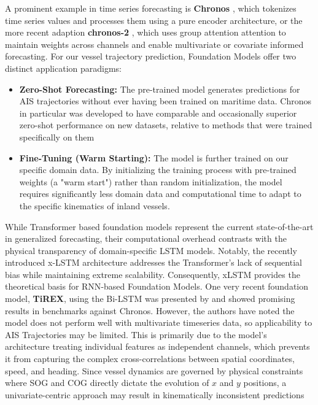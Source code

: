     A prominent example in time series forecasting is \textbf{Chronos} \cite{ansari2024chronoslearninglanguagetime}, which tokenizes time series values and processes them using a pure encoder architecture, or the more recent adaption \textbf{chronos-2} \parencite{ansari2025chronos2}, which uses group attention attention to maintain weights across channels and enable multivariate or covariate informed forecasting. For our vessel trajectory prediction, Foundation Models offer two distinct application paradigms:
    \begin{itemize}
        \item \textbf{Zero-Shot Forecasting:} The pre-trained model generates predictions for \ac{AIS} trajectories without ever having been trained on maritime data. Chronos in particular was developed to  have comparable and occasionally superior zero-shot performance on new datasets, relative to methods that were trained specifically on them \cite{ansari2024chronoslearninglanguagetime}
        \item \textbf{Fine-Tuning (Warm Starting):} The model is further trained on our specific domain data. By initializing the training process with pre-trained weights (a "warm start") rather than random initialization, the model requires significantly less domain data and computational time to adapt to the specific kinematics of inland vessels.
    \end{itemize} 

    While Transformer based foundation models represent the current state-of-the-art in generalized forecasting, their computational overhead contrasts with the physical transparency of domain-specific \ac{LSTM} models. Notably, the recently introduced \ac{x-LSTM} architecture \cite{beck2024xlstmextendedlongshortterm} addresses the Transformer's lack of sequential bias while maintaining extreme scalability. %
    Consequently, xLSTM provides the theoretical basis for \ac{RNN}-based Foundation Models. One very recent foundation model, \textbf{TiREX}, using the \ac{Bi-LSTM} was presented by \cite{auer2025tirexzeroshotforecastinglongtrex} and showed promising results in benchmarks against Chronos. However, the authors have noted the model does not perform well with multivariate timeseries data, so applicability to AIS Trajectories may be limited. This is primarily due to the model's architecture treating individual features as independent channels, which prevents it from capturing the complex cross-correlations between spatial coordinates, speed, and heading. Since vessel dynamics are governed by physical constraints where \ac{SOG} and \ac{COG} directly dictate the evolution of $x$ and $y$ positions, a univariate-centric approach may result in kinematically inconsistent predictions

